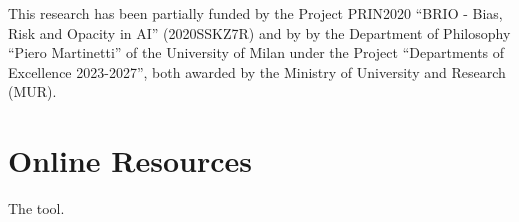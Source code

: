 \documentclass[
]{ceurart}
\begin{document}
\begin{acknowledgments}
This research has been partially funded by the Project PRIN2020 ``BRIO - Bias, Risk and Opacity in AI'' (2020SSKZ7R) and by by the Department of Philosophy ``Piero Martinetti'' of the University of Milan under the Project ``Departments of Excellence 2023-2027'', both awarded by the Ministry of University and Research (MUR).
\end{acknowledgments}



\appendix

\section{Online Resources}
The tool.
\end{document}
